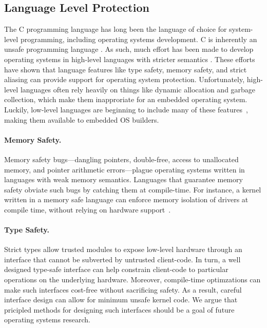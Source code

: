 \subsection{Language Level Protection}

The C programming language has long been the language of choice for system-level
programming, including operating systems development. C is inherently an unsafe
programming language \cite{kint:osdi2012, undefined:apsys2012}. As such, much
effort has been made to develop operating systems in high-level languages with
stricter semantics \cite{singularity:sigops, house:icfp2005, unikernels:2013}.
These efforts have shown that language features like type safety, memory safety,
and strict aliasing can provide support for operating system protection.
Unfortunately, high-level languages often rely heavily on things like dynamic
allocation and garbage collection, which make them inapproriate for an embedded
operating system. Luckily, low-level languages are beginning to include many of
these features~\cite{c++14,rust}, making them available to embedded OS builders.

\paragraph{Memory Safety.}
Memory safety bugs---dangling pointers, double-free, access to unallocated
memory, and pointer arithmetic errors---plague operating systems written in
languages with weak memory semantics.  Languages that guarantee memory safety
obviate such bugs by catching them at compile-time.  For instance, a kernel
written in a memory safe language can enforce memory isolation of drivers at
compile time, without relying on hardware support~\cite{spin:sosp}.

\paragraph{Type Safety.}
Strict types allow trusted modules to expose low-level hardware through an
interface that cannot be subverted by untrusted client-code. In turn, a well
designed type-safe interface can help constrain client-code to
particular operations on the underlying hardware. Moreover, compile-time
optimzations can make such interfaces cost-free without sacrificing safety. As a
result, careful interface design can allow for minimum unsafe kernel code. We
argue that pricipled methods for designing such interfaces should be a goal of
future operating systems research.

